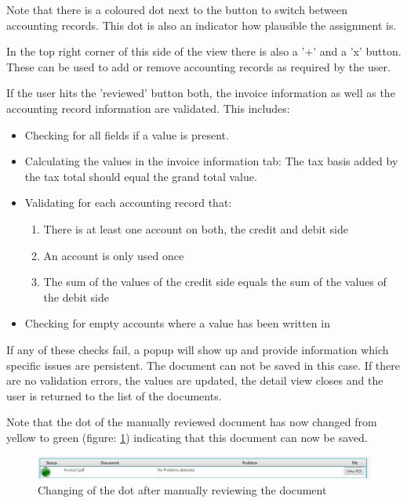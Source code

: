 Note that there is a coloured dot next to the button to switch between accounting records. This dot is also an indicator how plausible the assignment is. 

In the top right corner of this side of the view there is also a '+' and a 'x' button. These can be used to add or remove accounting records as required by the user.

If the user hits the 'reviewed' button both, the invoice information as well as the accounting record information are validated. This includes:
\begin{itemize}
	\item Checking for all fields if a value is present.
	\item Calculating the values in the invoice information tab: The tax basis added by the tax total should equal the grand total value.
	\item Validating for each accounting record that:
		\begin{enumerate}
			\item There is at least one account on both, the credit and debit side
			\item An account is only used once
			\item The sum of the values of the credit side equals the sum of the values of the debit side
		\end{enumerate}
	\item Checking for empty accounts where a value has been written in
\end{itemize}

If any of these checks fail, a popup will show up and provide information which specific issues are persistent. The document can not be saved in this case. If there are no validation errors, the values are updated, the detail view closes and the user is returned to the list of the documents.

Note that the dot of the manually reviewed document has now changed from yellow to green (figure: \ref{greenAfterReview}) indicating that this document can now be saved.

\begin{figure}[ht!]
\centering
\includegraphics[scale=0.6]{Images/GUI/GreenAfterReview.jpg}
\caption{Changing of the dot after manually reviewing the document \label{greenAfterReview}}
\end{figure}

